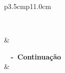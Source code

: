 \begin{center}
\renewcommand\LTcaptype{quadro}
\begin{longtable}{p{3.5cm}p{11.0cm}}

\caption[\textbf{\textbf{Histórico do Ensino de Empreendedorismo no Brasil}}]{\textbf{Histórico do Ensino de Empreendedorismo no Brasil}} \label{tabela_1} \\\hline \hline

\hline {} & \\ \hline 

\endfirsthead


%

{{\bfseries \quadroname \ \thequadro{} -\ \textbf{Continuação}}}\\

\hline {} &   \\ \hline 

\endhead

\hline {} \\ \hline

\endfoot
\hline {} \\ \hline

\endfoot
\hline {} \\ \hline
\hline \hline


\end{longtable}
\end{center}
